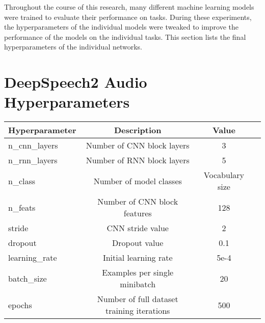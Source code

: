 Throughout the course of this research, many different machine learning models were
trained to evaluate their performance on tasks. During these experiments,
the hyperparameters of the individual models were tweaked to improve the performance of
the models on the individual tasks. This section lists the final hyperparameters of
the individual networks.

\section{DeepSpeech2 Audio Hyperparameters}


{\small\begin{center}
\begin{tabular} { | l | c | c | c | }
\hline
Hyperparameter & Description & Value \\
\hline
n\_cnn\_layers & Number of CNN block layers & 3 \\
n\_rnn\_layers & Number of RNN block layers & 5 \\
n\_class & Number of model classes & Vocabulary size \\
n\_feats & Number of CNN block features & 128 \\
stride & CNN stride value & 2 \\
dropout & Dropout value & 0.1 \\
learning\_rate & Initial learning rate & 5e-4 \\
batch\_size & Examples per single minibatch & 20 \\
epochs & Number of full dataset training iterations & 500 \\
\hline
\end{tabular}
\end{center}}